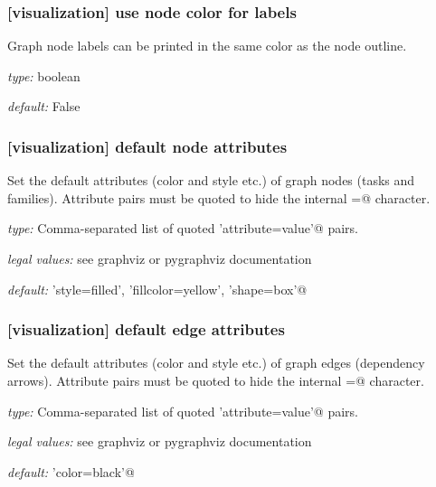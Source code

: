 \subsubsection[use node color for labels]{[visualization] \textrightarrow use node color for labels}

Graph node labels can be printed in the same color as the node outline.

\begin{myitemize}
    \item {\em type:} boolean
    \item {\em default:} False
\end{myitemize}


\subsubsection[default node attributes]{[visualization] \textrightarrow default node attributes}

Set the default attributes (color and style etc.) of graph nodes (tasks and families).
Attribute pairs must be quoted to hide the internal \lstinline@=@ character.

\begin{myitemize}
    \item {\em type:} Comma-separated list of quoted \lstinline@'attribute=value'@ pairs.
    \item {\em legal values:} see graphviz or pygraphviz documentation
    \item {\em default:} \lstinline@'style=filled', 'fillcolor=yellow', 'shape=box'@
\end{myitemize}

\subsubsection[default edge attributes]{[visualization] \textrightarrow default edge attributes}

Set the default attributes (color and style etc.) of graph edges
(dependency arrows).  Attribute pairs must be quoted to hide the
internal \lstinline@=@ character.
\begin{myitemize}
    \item {\em type:} Comma-separated list of quoted \lstinline@'attribute=value'@ pairs.
    \item {\em legal values:} see graphviz or pygraphviz documentation
    \item {\em default:} \lstinline@'color=black'@
\end{myitemize}

